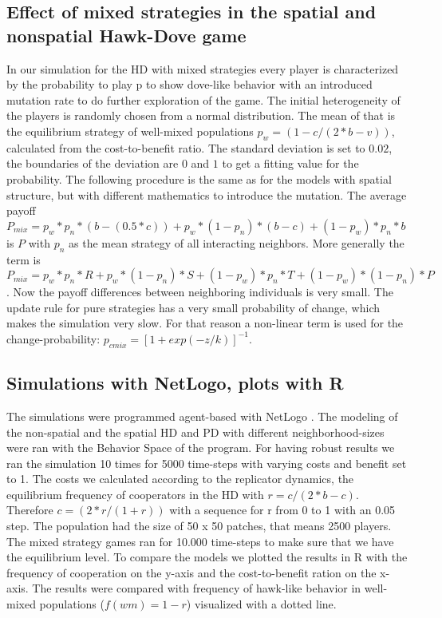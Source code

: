 \subsection{Effect of mixed strategies in the spatial and nonspatial Hawk-Dove game}
In our simulation for the HD with mixed strategies every player is characterized by the probability to play p to show dove-like behavior with an introduced mutation rate to do further exploration of the game. The initial heterogeneity of the players is randomly chosen from a normal distribution. The mean of that is the  equilibrium strategy of well-mixed populations $p_{w} = (1-c/(2*b-v))$, calculated from the cost-to-benefit ratio. The standard deviation is set to $0.02$, the boundaries of the deviation are $0$ and $1$ to get a fitting value for the probability. The following procedure is the same as for the models with spatial structure, but with different mathematics to introduce the mutation. The average payoff $P_{mix} = p_{w}*p_{n}*(b-(0.5*c))+ p_{w}*(1-p_{n})*(b-c)+(1-p_{w})*p_{n}*b$ is $P$ with $p_n$ as the mean strategy of all interacting neighbors. More generally the term is $P_{mix}  = p_{w}*p_{n}*R+ p_{w}*(1-p_{n})*S+(1-p_{w})*p_{n}*T+(1-p_{w})*(1-p_{n})*P$. Now the  payoff differences between neighboring individuals is very small. The update rule for pure strategies has a very small probability of change, which makes the simulation very slow. For that reason a non-linear term is used for the change-probability: $p_{cmix} = [1 + exp(-z/k)]^{-1}$.

\subsection{Simulations with NetLogo, plots with R}
The simulations were programmed agent-based with NetLogo \citep{Wilensky1999}. The modeling of the non-spatial and the spatial HD and PD with different neighborhood-sizes were ran with the Behavior Space of the program. For having robust results we ran the simulation 10 times for 5000 time-steps with varying costs and benefit set to 1. The costs we calculated according to the replicator dynamics, the equilibrium frequency of cooperators in the HD with $r=c/(2*b-c)$. Therefore $c=(2*r/(1+r))$ with a sequence for r from 0 to 1 with an 0.05 step. The population had the size  of 50 x 50 patches, that means 2500 players. The mixed strategy games ran for 10.000 time-steps to make sure that we have the equilibrium level. To compare the models we plotted the results in R \citep{R} with the frequency of cooperation on the y-axis and the cost-to-benefit ration on the x-axis. The results were compared with frequency of hawk-like behavior in well-mixed populations ($f(wm)=1-r$) visualized with a dotted line.

